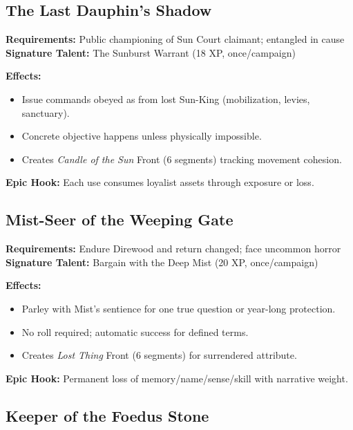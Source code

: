 \subsection{The Last Dauphin's Shadow}
\label{subsec:dauphin-shadow}

\textbf{Requirements:} Public championing of Sun Court claimant; entangled in cause\\
\textbf{Signature Talent:} The Sunburst Warrant (18 XP, once/campaign)

\textbf{Effects:}
\begin{itemize}
\item Issue commands obeyed as from lost Sun-King (mobilization, levies, sanctuary).
\item Concrete objective happens unless physically impossible.
\item Creates \emph{Candle of the Sun} Front (6 segments) tracking movement cohesion.
\end{itemize}

\textbf{Epic Hook:} Each use consumes loyalist assets through exposure or loss.

\subsection{Mist-Seer of the Weeping Gate}
\label{subsec:mist-seer}

\textbf{Requirements:} Endure Direwood and return changed; face uncommon horror\\
\textbf{Signature Talent:} Bargain with the Deep Mist (20 XP, once/campaign)

\textbf{Effects:}
\begin{itemize}
\item Parley with Mist's sentience for one true question or year-long protection.
\item No roll required; automatic success for defined terms.
\item Creates \emph{Lost Thing} Front (6 segments) for surrendered attribute.
\end{itemize}

\textbf{Epic Hook:} Permanent loss of memory/name/sense/skill with narrative weight.

\subsection{Keeper of the Foedus Stone}
\label{subsec:foedus-keeper}

